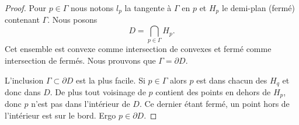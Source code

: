 \begin{proof}
    Pour \( p\in \Gamma\) nous notons \( l_p\) la tangente à \( \Gamma\) en \( p\) et \( H_p\) le demi-plan (fermé) contenant \( \Gamma\). Nous posons
    \begin{equation}        \label{EQooDYFTooCHRbsD}
        D=\bigcap_{p\in \Gamma}H_p.
    \end{equation}
    Cet ensemble est convexe comme intersection de convexes et fermé comme intersection de fermés. Nous prouvons que \( \Gamma=\partial D\). 


    L'inclusion \( \Gamma\subset\partial D\) est la plus facile. Si \( p\in \Gamma\) alors \( p\) est dans chacun des \( H_q\) et donc dans \( D\). De plus tout voisinage de \( p\) contient des points en dehors de \( H_p\), donc \( p\) n'est pas dans l'intérieur de \( D\). Ce dernier étant fermé, un point hors de l'intérieur est sur le bord. Ergo \( p\in\partial D\).


\end{proof}
